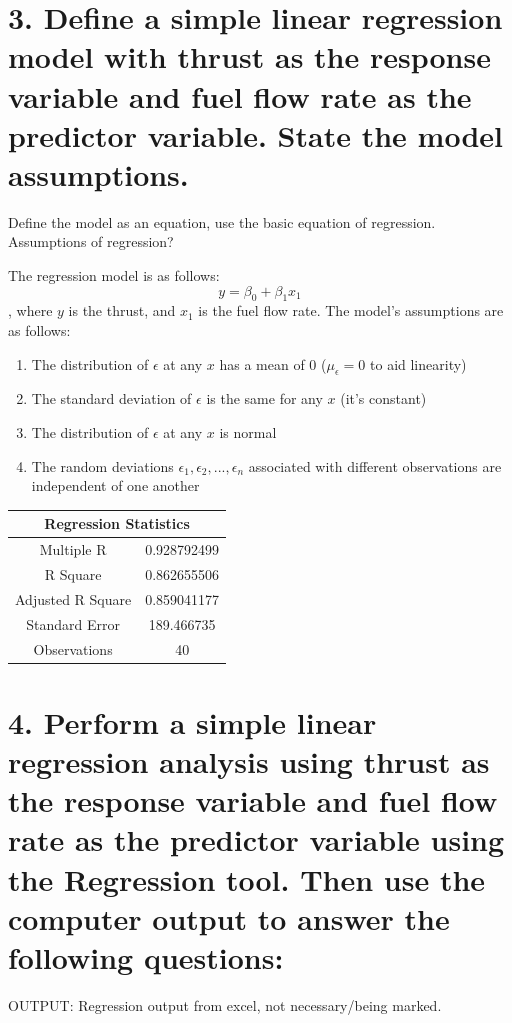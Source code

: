 \documentclass[letterpaper]{article}
\begin{document}
\section{3.	Define a simple linear regression model with thrust as the response variable and fuel flow rate as the predictor variable.  State the model assumptions.}
Define the model as an equation, use the basic equation of
regression. Assumptions of regression?

The regression model is as follows:
$$y = \beta_0 + \beta_1 x_1$$
, where $y$ is the thrust, and $x_1$ is the fuel flow rate. The model's assumptions
are as follows:
\begin{enumerate}
 \item The distribution of $\epsilon$ at any $x$ has a mean of 0 ($\mu_\epsilon=0$ to aid linearity)
 \item The standard deviation of $\epsilon$ is the same for any $x$ (it's constant)
 \item The distribution of $\epsilon$ at any $x$ is normal
 \item The random deviations $\epsilon_1, \epsilon_2, ..., \epsilon_n$ associated with different observations are independent of one another
\end{enumerate}

\begin{table}[H]
 \centering
 \begin{tabular}{|c|c|}
  \hline
  \multicolumn{2}{|c|}{Regression Statistics} \\ \hline
  Multiple R        & 0.928792499             \\ \hline
  R Square          & 0.862655506             \\ \hline
  Adjusted R Square & 0.859041177             \\ \hline
  Standard Error    & 189.466735              \\ \hline
  Observations      & 40                      \\ \hline
 \end{tabular}
\end{table}

\section{4.	Perform a simple linear regression analysis using thrust as the response variable and fuel flow rate as the predictor variable using the Regression tool. Then use the computer output to answer the following questions:}
OUTPUT: Regression output from excel, not necessary/being marked.
\end{document}
